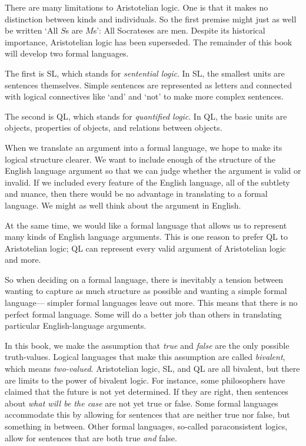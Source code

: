 There are many limitations to Aristotelian logic. One is that it makes no distinction between kinds and individuals. So the first premise might just as well be written `All $S$s are $M$s': All Socrateses are men. Despite its historical importance, Aristotelian logic has been superseded. The remainder of this book will develop two formal languages.

The first is SL, which stands for \emph{sentential logic}. In SL, the smallest units are sentences themselves. Simple sentences are represented as letters and connected with {logical connectives} like `and' and `not' to make more complex sentences.

The second is QL, which stands for \emph{quantified logic}. In QL, the basic units are objects, properties of objects, and relations between objects.




When we translate an argument into a formal language, we hope to make its logical structure clearer. We want to include enough of the structure of the English language argument so that we can judge whether the argument is valid or invalid. If we included every feature of the English language, all of the subtlety and nuance, then there would be no advantage in translating to a formal language. We might as well think about the argument in English.

At the same time, we would like a formal language that allows us to represent many kinds of English language arguments. This is one reason to prefer QL to Aristotelian logic; QL can represent every valid argument of Aristotelian logic and more.

So when deciding on a formal language, there is inevitably a tension between wanting to capture as much structure as possible and wanting a simple formal language--- simpler formal languages leave out more. This means that there is no perfect formal language. Some will do a better job than others in translating particular English-language arguments.

In this book, we make the assumption that \emph{true} and \emph{false} are the only possible truth-values. Logical languages that make this assumption are called \emph{bivalent}, which means \emph{two-valued}. Aristotelian logic, SL, and QL are all bivalent, but there are limits to the power of bivalent logic. For instance, some philosophers have claimed that the future is not yet determined. If they are right, then sentences about \emph{what will be the case} are not yet true or false.
Some formal languages accommodate this by allowing for sentences that are neither true nor false, but something in between.
Other formal languages, so-called paraconsistent logics, allow for sentences that are both true \emph{and} false.

